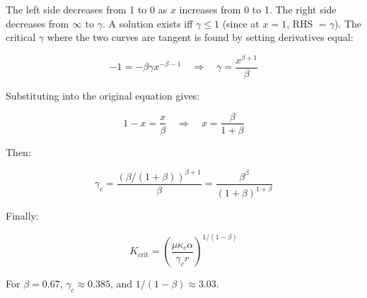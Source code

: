 \documentclass[12pt,a4paper]{article}
\theoremstyle{remark}
\newcommand{\kappac}{\kappa_c}
\begin{document}
	The left side decreases from 1 to 0 as $x$ increases from 0 to 1. The right side decreases from $\infty$ to $\gamma$. A solution exists iff $\gamma \leq 1$ (since at $x=1$, RHS $=\gamma$). The critical $\gamma$ where the two curves are tangent is found by setting derivatives equal:
	
	\begin{equation}
		-1 = -\beta \gamma x^{-\beta-1} \quad \Rightarrow \quad \gamma = \frac{x^{\beta+1}}{\beta}
		\label{eq:derivative}
	\end{equation}
	
	Substituting into the original equation gives:
	
	\begin{equation}
		1 - x = \frac{x}{\beta} \quad \Rightarrow \quad x = \frac{\beta}{1+\beta}
		\label{eq:x-crit}
	\end{equation}
	
	Then:
	
	\begin{equation}
		\gamma_c = \frac{(\beta/(1+\beta))^{\beta+1}}{\beta} = \frac{\beta^{\beta}}{(1+\beta)^{1+\beta}}
		\label{eq:gamma-c-app}
	\end{equation}
	
	Finally:
	
	\begin{equation}
		K_{\text{crit}} = \left( \frac{\mu \kappac \alpha}{\gamma_c r} \right)^{1/(1-\beta)}
		\label{eq:Kcrit-app}
	\end{equation}
	
	For $\beta = 0.67$, $\gamma_c \approx 0.385$, and $1/(1-\beta) \approx 3.03$.
	
\end{document}
